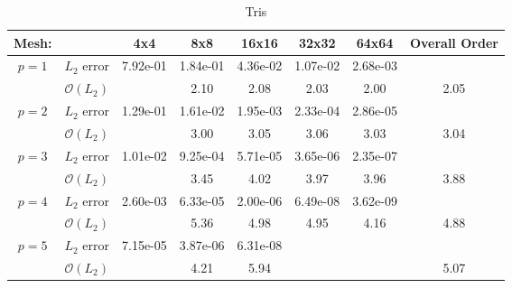 \begin{table}[H]
\centering
\begin{tabular}{ c c c c c c c c} 
  
 Mesh: &   & 4x4 & 8x8 & 16x16 & 32x32 & 64x64 & Overall Order \\ 
 \hline 
 \multirow{2}{*}{$p = 1$} & $L_2$ error & 7.92e-01 & 1.84e-01 & 4.36e-02 & 1.07e-02 & 2.68e-03 &   \\ 
  
   & $\mathcal{O}(L_2)$ &   & 2.10 & 2.08 & 2.03 & 2.00 & 2.05 \\ 
 \hline 
 \multirow{2}{*}{$p = 2$} & $L_2$ error & 1.29e-01 & 1.61e-02 & 1.95e-03 & 2.33e-04 & 2.86e-05 &   \\ 
  
   & $\mathcal{O}(L_2)$ &   & 3.00 & 3.05 & 3.06 & 3.03 & 3.04 \\ 
 \hline 
 \multirow{2}{*}{$p = 3$} & $L_2$ error & 1.01e-02 & 9.25e-04 & 5.71e-05 & 3.65e-06 & 2.35e-07 &   \\ 
  
   & $\mathcal{O}(L_2)$ &   & 3.45 & 4.02 & 3.97 & 3.96 & 3.88 \\ 
 \hline 
 \multirow{2}{*}{$p = 4$} & $L_2$ error & 2.60e-03 & 6.33e-05 & 2.00e-06 & 6.49e-08 & 3.62e-09 &   \\ 
  
   & $\mathcal{O}(L_2)$ &   & 5.36 & 4.98 & 4.95 & 4.16 & 4.88 \\ 
 \hline 
 \multirow{2}{*}{$p = 5$} & $L_2$ error & 7.15e-05 & 3.87e-06 & 6.31e-08 &   &   &   \\ 
  
   & $\mathcal{O}(L_2)$ &   & 4.21 & 5.94 &   &   & 5.07 \\ 
 \hline 
 \end{tabular}
\caption{Tris} 
 \end{table}
